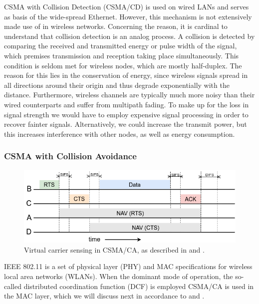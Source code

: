 CSMA with Collision Detection (CSMA/CD) is used on wired LANs and serves as basis of the wide-spread Ethernet. However, this mechanism is not extensively made use of in wireless networks. Concerning the reason, it is cardinal to understand that collision detection is an analog process. A collision is detected by comparing the received and transmitted energy or pulse width of the signal, which premises transmission and reception taking place simultaneously. This condition is seldom met for wireless nodes, which are mostly half-duplex. The reason for this lies in the conservation of energy, since wireless signals spread in all directions around their origin and thus degrade exponentially with the distance. Furthermore, wireless channels are typically much more noisy than their wired counterparts and suffer from multipath fading. To make up for the loss in signal strength we would have to employ expensive signal processing in order to recover fainter signals. Alternatively, we could increase the transmit power, but this increases interference with other nodes, as well as energy consumption.

\subsubsection{CSMA with Collision Avoidance}
\label{sec:csma-ca}

\begin{figure}[tb]
	\label{fig:virtual_carrier_sensing}
	\begin{center}
		\includegraphics[width=14cm]{pictures/virtual_carrier_sensing}
	\end{center}
	\caption{Virtual carrier sensing in CSMA/CA, as described in \cite{Tanenbaum02} and \cite{Gast05}.}
\end{figure}

IEEE 802.11 is a set of physical layer (PHY) and MAC specifications for wireless local area networks (WLANs). When the dominant mode of operation, the so-called distributed coordination function (DCF) is employed CSMA/CA is used in the MAC layer, which we will discuss next in accordance to \cite{Gast05} and \cite{Garg07}. 

